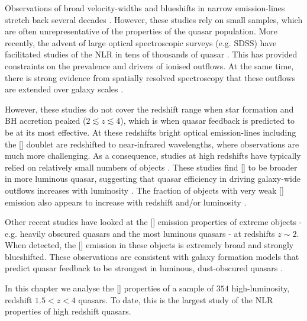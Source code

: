 Observations of broad velocity-widths and blueshifts in narrow emission-lines stretch back several decades \citep[e.g.][]{weedman70,stockton76,heckman81,veron81,feldman82,heckman84,vrtilek85,whittle85,boroson92}. 
However, these studies rely on small samples, which are often unrepresentative of the properties of the quasar population. 
More recently, the advent of large optical spectroscopic surveys (e.g. SDSS) have facilitated studies of the NLR in tens of thousands of quasar \citep[e.g.][]{boroson05,greene05a,zhang11,mullaney13,zakamska14,shen14}. 
This has provided constraints on the prevalence and drivers of ionised outflows.   
At the same time, there is strong evidence from spatially resolved spectroscopy that these outflows are extended over galaxy scales \citep[e.g.][]{greene09,greene11,hainline13,harrison12,harrison14}. 

However, these studies do not cover the redshift range when star formation and BH accretion peaked ($2 \lesssim z \lesssim 4$), which is when quasar feedback is predicted to be at its most effective.  
At these redshifts bright optical emission-lines including the [] doublet are redshifted to near-infrared wavelengths, where observations are much more challenging. 
As a consequence, studies at high redshifts have typically relied on relatively small numbers of objects \citep[e.g.][]{netzer04,sulentic04,shen16a}.
These studies find [] to be broader in more luminous quasar, suggesting that quasar efficiency in driving galaxy-wide outflows increases with luminosity \citep[e.g.][]{netzer04,nesvadba08,kim13,brusa15,carniani15,perna15,bischetti16}. 
The fraction of objects with very weak [] emission also appears to increase with redshift and/or luminosity \citep[e.g.][]{netzer04}. 

Other recent studies have looked at the [] emission properties of extreme objects - e.g. heavily obscured quasars \citep{zakamska16} and the most luminous quasars \citep{bischetti16} - at redshifts $z\sim2$. 
When detected, the [] emission in these objects is extremely broad and strongly blueshifted. 
These observations are consistent with galaxy formation models that predict quasar feedback to be strongest in luminous, dust-obscured quasars \citep[e.g.][]{sanders88}. 

In this chapter we analyse the [] properties of a sample of $354$ high-luminosity, redshift $1.5 < z < 4$ quasars.
To date, this is the largest study of the NLR properties of high redshift quasars. 

